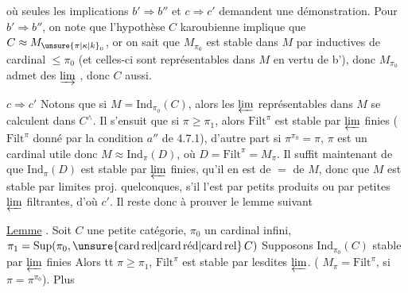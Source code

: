 où seules les implications  $b'\Rightarrow b''$ et $c\Rightarrow c'$ demandent une démonstration. Pour $b'\Rightarrow b''$, on note que l'hypothèse $C$ karoubienne implique que $C\approx M_{\unsure{\pi|\kappa|k}_0}$,  or on sait que $M_{\pi_0}$ est stable dans $M$ par  inductives de cardinal $\leq\pi_0$ (et celles-ci sont représentables dans $M$ en vertu de b'), donc  $M_{\pi_0}$   admet des $\varinjlim$ , donc $C$ aussi.

$c\Rightarrow c'$ Notons que si $M=\mathrm{Ind}_{\pi_0}(C)$, alors les $\varprojlim$ représentables dans $M$ se calculent dans $C^\wedge$. Il s'ensuit que si $\pi\geq\pi_1$, alors $\mathrm{Filt}^{\pi}$ est stable par $\varprojlim$ finies ($\mathrm{Filt}^{\pi}$  donné  par la condition $a''$ de 4.7.1), d'autre part si  $\pi^{\pi_0}=\pi$,  $\pi$ est un cardinal utile donc $M\approx\mathrm{Ind}_{\pi}(D)$, où $D=\mathrm{Filt}^{\pi}=M_{\pi}$. Il suffit maintenant de  que $\mathrm{Ind}_{\pi}(D)$ est  stable par $\varprojlim$ finies,   qu'il en est de $=$ de $M$, donc que $M$ est stable par limites proj. quelconques, s'il l'est par petits produits ou par petites $\varprojlim$ filtrantes, d'où $c'$. Il reste  donc à prouver le lemme suivant 

\uline{Lemme} .  Soit  $C$ une petite catégorie, $\pi_0$ un cardinal infini, $\pi_1=\mathrm{Sup}(\pi_0,\unsure{\mathrm{card\,red}|\mathrm{card}\,\text{réd}|\mathrm{card\,rel}}\,C)$ Supposons $\mathrm{Ind}_{\pi_0}(C)$ stable par $\varprojlim$ finies  Alors  tt $\pi\geq\pi_1$, $\mathrm{Filt}^{\pi}$ est stable par lesdites $\varprojlim$. ( $M_\pi=\mathrm{Filt}^{\pi}$, si $\pi=\pi^{\pi_0}$). Plus
